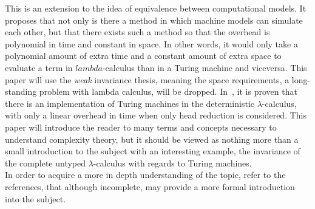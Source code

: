 \documentclass[12pt]{article}
\begin{document}
This is an extension to the idea of equivalence between computational models. It proposes that not only is there a method in which machine models can simulate each other, but that there exists such a method so that the overhead is polynomial in time and constant in space. In other words, it would only take a polynomial amount of extra time and a constant amount of extra space to evaluate a term in $lambda$-calculus than in a Turing machine and viceversa.
This paper will use the \textit{weak} invariance thesis, meaning the space requirements, a long-standing problem with lambda calculus, will be dropped.
In~\cite{invariance-of-cost-model}, it is proven that there is an implementation of Turing machines in the deterministic $\lambda$-calculus, with only a linear overhead in time when only head reduction is considered. This paper will introduce the reader to many terms and concepts necessary to understand complexity theory, but it should be viewed as nothing more than a small introduction to the subject with an interesting example, the invariance of the complete untyped $\lambda$-calculus with regards to Turing machines. \\
In order to acquire a more in depth understanding of the topic, refer to the references, that although incomplete, may provide a more formal introduction into the subject.
\end{document}
